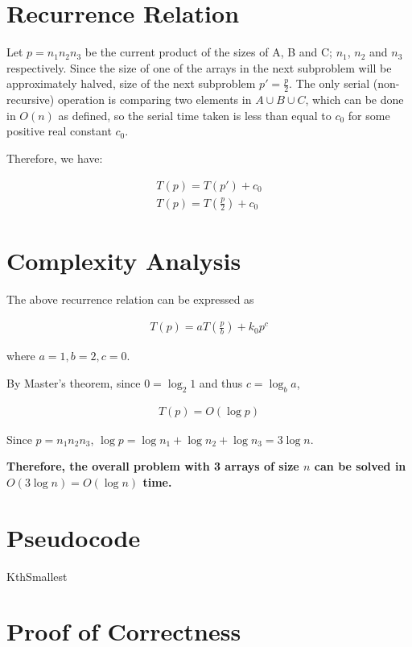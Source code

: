 \documentclass{article}
\begin{document}
\section{Recurrence Relation}

Let $p = n_1n_2n_3$ be the current product of the sizes of A, B and C; $n_1$, $n_2$ and $n_3$ respectively. Since the size of one of the arrays in the next subproblem will be approximately halved, size of the next subproblem $p' = \frac{p}{2}$. The only serial (non-recursive) operation is comparing two elements in $A \cup B \cup C$, which can be done in $O(n)$ as defined, so the serial time taken is less than equal to $c_0$ for some positive real constant $c_0$. 

Therefore, we have:

\begin{align*}
    T(p) = T(p') + c_0 \\
    T(p) = T(\frac{p}{2}) + c_0
\end{align*}

\section{Complexity Analysis}

The above recurrence relation can be expressed as 

\begin{align*}
    T(p) = aT(\frac{p}{b}) + k_0p^c
\end{align*}

where $a = 1, b = 2, c = 0$.

By Master's theorem, since $0 = \log_2{1}$ and thus $c = \log_b{a}$, 

\begin{align*}
    T(p) = O(\log p)
\end{align*}

Since $p = n_1n_2n_3$, $\log p = \log n_1 + \log n_2 + \log n_3 = 3 \log n$.

\textbf{Therefore, the overall problem with 3 arrays of size $n$ can be solved in $O(3 \log n) = O(\log n)$ time.} 

\section{Pseudocode}

\begin{algorithm}[H]
\caption{KthSmallest}
\begin{algorithmic}[1]

\EndFunction

\end{algorithmic}
\end{algorithm}

\section{Proof of Correctness}
\end{document}
